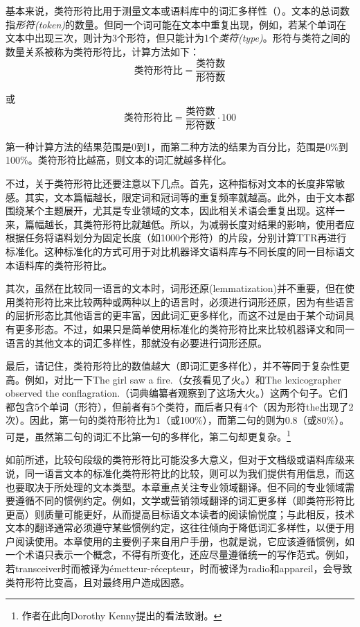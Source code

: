 \documentclass[output=paper]{langscibook}
\begin{document}
基本来说，类符形符比用于测量文本或语料库中的词汇多样性（\citealt{Williamson2009}）。文本的总词数指\textit{形符(token)}的数量。但同一个词可能在文本中重复出现，例如，若某个单词在文本中出现三次，则计为3个形符，但只能计为1个\textit{类符(type)}。形符与类符之间的数量关系被称为类符形符比，计算方法如下：
\begin{equation}
\text{类符形符比}=\frac{\text{类符数}}{\text{形符数}}
\end{equation}

\noindent 或
\begin{equation}
\text{类符形符比}=\frac{\text{类符数}}{\text{形符数}} \cdot 100
\end{equation}

第一种计算方法的结果范围是0到1，而第二种方法的结果为百分比，范围是0\%到100\%。类符形符比越高，则文本的词汇就越多样化。

不过，关于类符形符比还要注意以下几点。首先，这种指标对文本的长度非常敏感。其实，文本篇幅越长，限定词和冠词等的重复频率就越高。此外，由于文本都围绕某个主题展开，尤其是专业领域的文本，因此相关术语会重复出现。这样一来，篇幅越长，其类符形符比就越低。所以，为减弱长度对结果的影响，使用者应根据任务将语料划分为固定长度（如1000个形符）的片段，分别计算TTR再进行标准化。这种标准化的方式可用于对比机器译文语料库与不同长度的同一目标语文本语料库的类符形符比。

其次，虽然在比较同一语言的文本时，词形还原(lemmatization)并不重要，但在使用类符形符比来比较两种或两种以上的语言时，必须进行词形还原，因为有些语言的屈折形态比其他语言的更丰富，因此词汇更多样化，而这不过是由于某个动词具有更多形态。不过，如果只是简单使用标准化的类符形符比来比较机器译文和同一语言的其他文本的词汇多样性，那就没有必要进行词形还原。

最后，请记住，类符形符比的数值越大（即词汇更多样化），并不等同于复杂性更高。例如，对比一下The girl saw a fire.（女孩看见了火。）和The lexicographer observed the
conflagration.（词典编纂者观察到了这场大火。）这两个句子。它们都包含5个单词（形符），但前者有5个类符，而后者只有4个（因为形符the出现了2次）。因此，第一句的类符形符比为1（或100\%），而第二句的则为0.8（或80\%）。可是，虽然第二句的词汇不比第一句的多样化，第二句却更复杂。\footnote{作者在此向Dorothy Kenny提出的看法致谢。}

如前所述，比较句段级的类符形符比可能没多大意义，但对于文档级或语料库级来说，同一语言文本的标准化类符形符比的比较，则可以为我们提供有用信息，而这也要取决于所处理的文本类型。本章重点关注专业领域翻译。但不同的专业领域需要遵循不同的惯例约定。例如，文学或营销领域翻译的词汇更多样（即类符形符比更高）则质量可能更好，从而提高目标语文本读者的阅读愉悦度；与此相反，技术文本的翻译通常必须遵守某些惯例约定，这往往倾向于降低词汇多样性，以便于用户阅读使用。本章使用的主要例子来自用户手册，也就是说，它应该遵循惯例，如一个术语只表示一个概念，不得有所变化，还应尽量遵循统一的写作范式。例如，若transceiver时而被译为émetteur-récepteur，时而被译为radio和appareil，会导致类符形符比变高，且对最终用户造成困惑。
\end{document}
